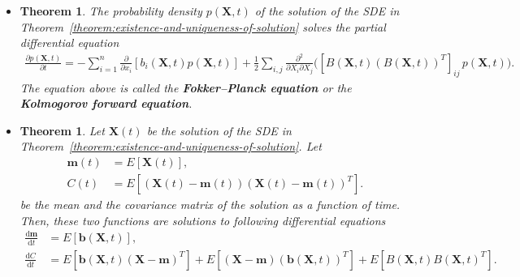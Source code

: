 \documentclass[10pt]{article}
\newtheorem{theorem}[lemma]{Theorem}
\newcommand{\dee}{\mathrm{d}}
\newcommand{\ve}[1]{\mathbf{#1}}
\begin{document}
\begin{itemize}
  \item \begin{theorem}
    The probability density $p(\ve{X},t)$ of the solution of the SDE in Theorem~\ref{theorem:existence-and-uniqueness-of-solution} solves the partial differential equation
    \begin{align*}
      \frac{\partial p(\ve{X},t)}{\partial t}
      = - \sum_{i=1}^n \frac{\partial }{\partial x_i} [ b_i(\ve{X}, t) p(\ve{X},t) ] + \frac{1}{2} \sum_{i,j} \frac{\partial^2}{\partial X_i \partial X_j} \bigg( [B(\ve{X},t) (B(\ve{X},t))^T]_{ij}\, p(\ve{X}, t) \bigg).
    \end{align*}
    The equation above is called the {\bf Fokker--Planck equation} or the {\bf Kolmogorov forward equation}.
  \end{theorem}

  \item \begin{theorem}
    Let $\ve{X}(t)$ be the solution of the SDE in Theorem~\ref{theorem:existence-and-uniqueness-of-solution}. Let 
    \begin{align*}
      \ve{m}(t) &= E[\ve{X}(t)], \\
      C(t) &= E[(\ve{X}(t) - \ve{m}(t))(\ve{X}(t) - \ve{m}(t))^T].
    \end{align*}
    be the mean and the covariance matrix of the solution as a function of time. Then, these two functions are solutions to following differential equations
    \begin{align*}
      \frac{\dee\ve{m}}{\dee t} &= E[\ve{b}(\ve{X},t)], \\
      \frac{\dee C}{\dee t}
      &= E[\ve{b}(\ve{X},t)(\ve{X} - \ve{m})^T] + E[(\ve{X} - \ve{m})(\ve{b}(\ve{X},t))^T] + E[B(\ve{X},t)B(\ve{X},t)^T].
    \end{align*}
  \end{theorem}
\end{itemize}
\end{document}
